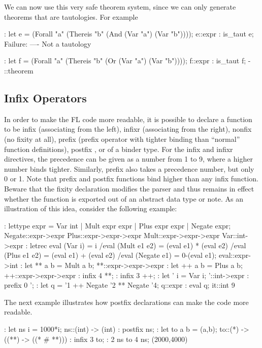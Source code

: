 We can now use this very safe theorem system, since we can only generate
theorems that are
tautologies. For example
\begin{hol}
: let e = (Forall "a" (Thereis "b" (And (Var "a") (Var "b"))));
e::expr
: is\_taut e;
Failure:    ----   Not a tautology


: let f = (Forall "a" (Thereis "b" (Or (Var "a") (Var "b"))));
f::expr
: is\_taut f;
- ::theorem
\end{hol}

\subsection{Infix Operators}

In order to make the FL code more readable, it is possible to declare
a function to be infix%
%
{} (associating from the left), infixr%
%
{}
(associating from the right), nonfix%
%
{} (no fixity at all), prefix
%
{} (prefix operator with tighter binding than ``normal'' function definitions),
postfix%
%
{}, or
of a binder%
%
{} type.
For the infix and infixr directives, the precedence can be given as
a number from 1 to 9, where a higher number binds tighter.
Similarly, prefix also takes a precedence number, but only 0 or 1.
Note that prefix and postfix functions bind higher than any infix function.
Beware that the fixity declaration modifies the parser and
thus remains in effect whether
the function is exported out of an abstract data type or note.
As an illustration of this idea, consider the following example:
\begin{hol}
: lettype expr = Var int |
                Mult expr expr |
                Plus expr expr |
                Negate expr;
Negate::expr->expr
Plus::expr->expr->expr
Mult::expr->expr->expr
Var::int->expr
: letrec eval (Var i) = i
  /\verb@\@     eval (Mult e1 e2) = (eval e1) * (eval e2)
  /\verb@\@     eval (Plus e1 e2) = (eval e1) + (eval e2)
  /\verb@\@     eval (Negate e1) = 0-(eval e1);
eval::expr->int
: let ** a b = Mult a b;
**::expr->expr->expr
: let ++ a b = Plus a b;
++::expr->expr->expr
: infix 4 **;
: infix 3 ++;
: let ' i = Var i;
'::int->expr
: prefix 0 ';
: let q = '1 ++ Negate '2 ** Negate '4;
q::expr
: eval q;
it::int
9
\end{hol}

The next example illustrates how postfix declarations can make the
code more readable.
\begin{hol}
: let ns i = 1000*i;
ns::(int) -> (int)
: postfix ns;
: let to a b = (a,b);
to::(*) -> ((**) -> ((* # **)))
: infix 3 to;
: 2 ns to 4 ns;
(2000,4000)
\end{hol}

